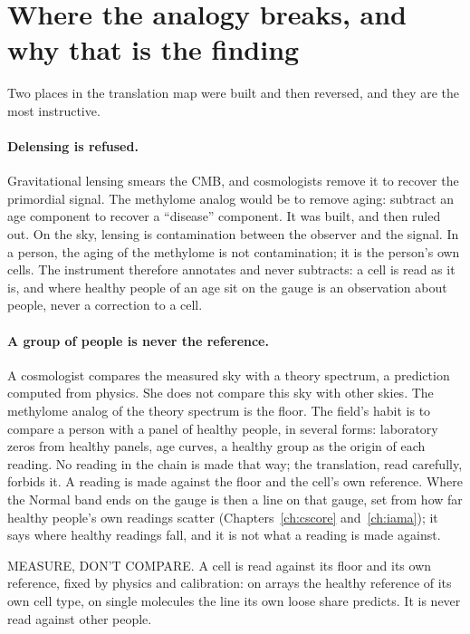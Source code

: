 \section{Where the analogy breaks, and why that is the finding}

Two places in the translation map were built and then reversed, and they are the most instructive.

\paragraph{Delensing is refused.} Gravitational lensing smears the CMB, and cosmologists remove it to recover the primordial
signal. The methylome analog would be to remove aging: subtract an age component to recover a ``disease'' component. It was
built, and then ruled out. On the sky, lensing is contamination between the observer and the signal. In a person, the aging of
the methylome is not contamination; it is the person's own cells. The instrument therefore annotates and never subtracts: a cell
is read as it is, and where healthy people of an age sit on the gauge is an observation about people, never a correction to a
cell.

\paragraph{A group of people is never the reference.} A cosmologist compares the measured sky with a theory spectrum, a prediction
computed from physics. She does not compare this sky with other skies. The methylome analog of the theory spectrum is the floor.
The field's habit is to compare a person with a panel of healthy people, in several forms: laboratory zeros from healthy panels, age curves, a healthy group as the origin of each reading. No reading in the chain is made that way; the translation, read carefully, forbids it. A reading is made against the floor and the cell's own reference. Where the Normal band ends on the gauge is then a line on that gauge, set from how far healthy people's own readings scatter (Chapters~\ref{ch:cscore} and~\ref{ch:iama}); it says where healthy readings fall, and it is not what a reading is made against.

\begin{rulebox}
MEASURE, DON'T COMPARE. A cell is read against its floor and its own reference, fixed by physics and calibration: on arrays the healthy reference of its own cell type, on single molecules the line its own loose share predicts. It is never read against other people.
\end{rulebox}

